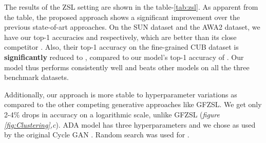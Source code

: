 \documentclass[10pt,twocolumn,letterpaper]{article}
\begin{document}
The results of the ZSL setting are shown in the table-\ref{tab:zsl}. As apparent from the table, the proposed approach shows a significant improvement over the previous state-of-art approaches. On the SUN dataset and the AWA2 dataset, we have our top-1 accuracies  and  respectively, which are better than its close competitor \cite{verma2017simple}. Also, their top-1 accuracy on the fine-grained CUB dataset is \textbf{significantly} reduced to ,  compared to our model's top-1 accuracy of . Our model thus performs consistently well and beats other models on all the three benchmark datasets.

Additionally, our approach is more stable to hyperparameter variations as compared to the other competing generative approaches like GFZSL\cite{verma2017simple}. We get only 2-4\% drops in accuracy on a logarithmic scale, unlike GFZSL\cite{verma2017simple} (\textit{figure \ref{fig:Clustering},c}). ADA model has three hyperparameters  and we chose   as used by the original Cycle GAN \cite{cyclegan}. Random search was used for .
\end{document}
